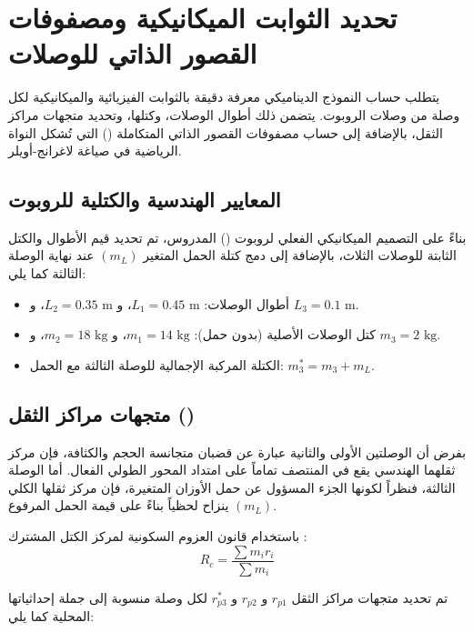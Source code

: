 \section{تحديد الثوابت الميكانيكية ومصفوفات القصور الذاتي للوصلات}
\label{sec:mass_inertia_parameters}

يتطلب حساب النموذج الديناميكي معرفة دقيقة بالثوابت الفيزيائية والميكانيكية لكل وصلة من وصلات الروبوت. يتضمن ذلك أطوال الوصلات، وكتلها، وتحديد متجهات مراكز الثقل، بالإضافة إلى حساب مصفوفات القصور الذاتي المتكاملة () التي تُشكل النواة الرياضية في صياغة لاغرانج-أويلر.

\subsection{المعايير الهندسية والكتلية للروبوت}
بناءً على التصميم الميكانيكي الفعلي لروبوت () المدروس، تم تحديد قيم الأطوال والكتل الثابتة للوصلات الثلاث، بالإضافة إلى دمج كتلة الحمل المتغير $(m_L)$ عند نهاية الوصلة الثالثة كما يلي:
\begin{itemize}
    \item أطوال الوصلات: $L_1 = 0.45 \text{ m}$، و $L_2 = 0.35 \text{ m}$، و $L_3 = 0.1 \text{ m}$.
    \item كتل الوصلات الأصلية (بدون حمل): $m_1 = 14 \text{ kg}$، و $m_2 = 18 \text{ kg}$، و $m_3 = 2 \text{ kg}$.
    \item الكتلة المركبة الإجمالية للوصلة الثالثة مع الحمل: $m_3^* = m_3 + m_L$.
\end{itemize}

\subsection{متجهات مراكز الثقل ()}
بفرض أن الوصلتين الأولى والثانية عبارة عن قضبان متجانسة الحجم والكثافة، فإن مركز ثقلهما الهندسي يقع في المنتصف تماماً على امتداد المحور الطولي الفعال. أما الوصلة الثالثة، فنظراً لكونها الجزء المسؤول عن حمل الأوزان المتغيرة، فإن مركز ثقلها الكلي ينزاح لحظياً بناءً على قيمة الحمل المرفوع $(m_L)$. 

باستخدام قانون العزوم السكونية لمركز الكتل المشترك :
\begin{equation}
R_c = \frac{\sum m_i r_i}{\sum m_i}
\end{equation}

تم تحديد متجهات مراكز الثقل $r_{p1}$ و $r_{p2}$ و $r_{p3}^*$ لكل وصلة منسوبة إلى جملة إحداثياتها المحلية كما يلي:

